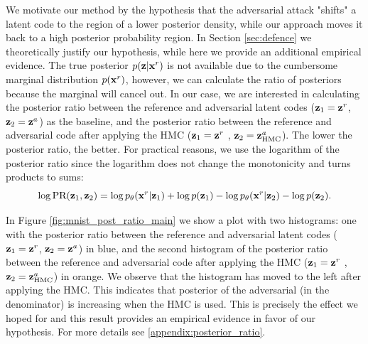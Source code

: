 We motivate our method by the hypothesis that the adversarial attack "shifts" a latent code to the region of a lower posterior density, while our approach moves it back to a high posterior probability region. In Section \ref{sec:defence} we theoretically justify our hypothesis, while here we provide an additional empirical evidence.
The true posterior $p({\mathbf{z}} | {\mathbf{x}}^{r})$ is not available due to the cumbersome marginal distribution $p({\mathbf{x}}^{r})$, however, we can calculate the ratio of posteriors because the marginal will cancel out. In our case, we are interested in calculating the posterior ratio between the reference and adversarial latent codes (${\mathbf{z}}_1 = {\mathbf{z}}^r$,  ${\mathbf{z}}_2 = {\mathbf{z}}^a$) as the baseline, and the posterior ratio between the reference and adversarial code after applying the HMC (${\mathbf{z}}_1 = {\mathbf{z}}^r$ , ${\mathbf{z}}_2 = {\mathbf{z}}^a_{\text{HMC}}$). The lower the posterior ratio, the better. For practical reasons, we use the logarithm of the posterior ratio since the logarithm does not change the monotonicity and turns products to sums:
\begin{equation}
    \log \text{PR}({\mathbf{z}}_1, {\mathbf{z}}_2) = \log p_{\theta}({\mathbf{x}}^r|{\mathbf{z}}_1) + \log p({\mathbf{z}}_1) - \log p_{\theta}({\mathbf{x}}^r| {\mathbf{z}}_2) - \log p({\mathbf{z}}_2) .
\end{equation}

In Figure \ref{fig:mnist_post_ratio_main} we show a plot with two histograms: one with the posterior ratio between the reference and adversarial latent codes (${\mathbf{z}}_1 = {\mathbf{z}}^r$,  ${\mathbf{z}}_2 = {\mathbf{z}}^a$) in blue, and the second histogram of the posterior ratio between the reference and adversarial code after applying the HMC (${\mathbf{z}}_1 = {\mathbf{z}}^r$ , ${\mathbf{z}}_2 = {\mathbf{z}}^a_{\text{HMC}}$) in orange. We observe that the histogram has moved to the left after applying the HMC. This indicates that posterior of the adversarial (in the denominator) is increasing when the HMC is used. This is precisely the effect we hoped for and this result provides an empirical evidence in favor of our hypothesis. For more details see \ref{appendix:posterior_ratio}.


